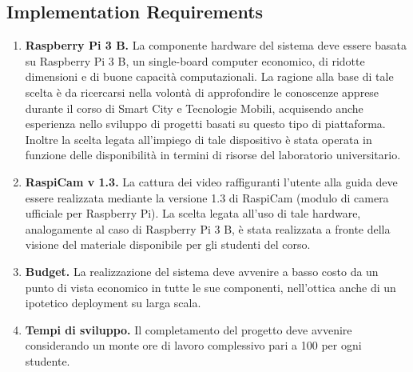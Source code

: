 \documentclass[12pt]{article}
\begin{document}
\subsection{Implementation Requirements}
\begin{enumerate}
	\item \textbf{Raspberry Pi 3 B.} La componente hardware del sistema deve essere basata su Raspberry Pi 3 B, un single-board computer economico, di ridotte dimensioni e di buone capacità computazionali. La ragione alla base di tale scelta è da ricercarsi nella volontà di approfondire le conoscenze apprese durante il corso di Smart City e Tecnologie Mobili, acquisendo anche esperienza nello sviluppo di progetti basati su questo tipo di piattaforma. Inoltre la scelta legata all'impiego di tale dispositivo è stata operata in funzione delle disponibilità in termini di risorse del laboratorio universitario.
	\item \textbf{RaspiCam v 1.3.} La cattura dei video raffiguranti l'utente alla guida deve essere realizzata mediante la versione 1.3 di RaspiCam (modulo di camera ufficiale per Raspberry Pi). La scelta legata all'uso di tale hardware, analogamente al caso di Raspberry Pi 3 B, è stata realizzata a fronte della visione del materiale disponibile per gli studenti del corso.
	\item \textbf{Budget.} La realizzazione del sistema deve avvenire a basso costo da un punto di vista economico in tutte le sue componenti, nell'ottica anche di un ipotetico deployment su larga scala.
	\item \textbf{Tempi di sviluppo.} Il completamento del progetto deve avvenire considerando un monte ore di lavoro complessivo pari a 100 per ogni studente.
\end{enumerate}

\end{document}
